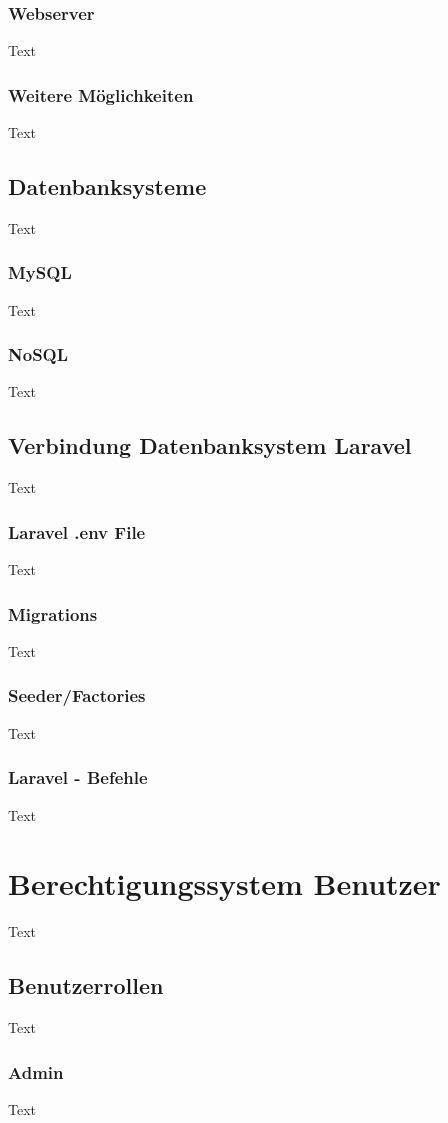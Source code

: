 \subsubsection{Webserver}
Text
\subsubsection{Weitere Möglichkeiten}
Text

\subsection{Datenbanksysteme}
Text
\subsubsection{MySQL}
Text
\subsubsection{NoSQL}
Text

\subsection{Verbindung Datenbanksystem Laravel}
Text
\subsubsection{Laravel .env File }
Text
\subsubsection{Migrations}
Text
\subsubsection{Seeder/Factories}
Text
\subsubsection{Laravel - Befehle}
Text


\section{Berechtigungssystem Benutzer}
Text
\subsection{Benutzerrollen }
Text
\subsubsection{Admin}
Text
